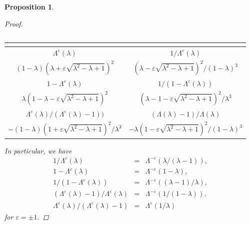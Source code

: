 \documentclass[a4paper, 11pt]{article}
\theoremstyle{plain}
\newtheorem{prop}[defn]{Proposition}
\newcommand{\?}{\textcolor{red}{??}}
\newcommand{\lm}{\lambda}
\newcommand{\Lm}{\Lambda}
\begin{document}
\begin{prop}
\begin{proof}
\begin{center}
\begin{tabular}{c||c}
    \end{tabular}
 \end{center}

  \begin{center}
   \begin{tabular}{c||c}
    \multicolumn{2}{c}{} \\ \hline \hline

$\Lm^{\varepsilon}(\lm)$ &$1/\Lm^{\varepsilon}(\lm)$\\ \hline
$(1-\lm)(\lm+\varepsilon\sqrt{{\lm}^2-\lm+1})^2$ &$(\lm-\varepsilon\sqrt{\lm^2-\lm+1})^2/(1-\lm)^3$\\
\hline\hline
$1-\Lm^{\varepsilon}(\lm)$ & $1/(1-\Lm^{\varepsilon}(\lm))$ \\ \hline
$\lm(1-\lm-\varepsilon\sqrt{\lm^2-\lm+1})^2$ &  $(\lm-1-\varepsilon\sqrt{\lm^2-\lm+1})^2/\lm^3$ \\
\hline \hline
$\Lm^{\varepsilon}(\lm)/(\Lm^{\varepsilon}(\lm)-1))$ & $(\Lm(\lm)-1)/\Lm(\lm)$\\ \hline
$-(1-\lm)(1+\varepsilon\sqrt{\lm^2-\lm+1})^2/\lm^3$ & $-\lm(1-\varepsilon\sqrt{\lm^2-\lm+1})^2/(1-\lm)^3$\\
\hline \hline

    \end{tabular}
 \end{center}
 In particular, we have
  \begin{eqnarray*}
       1/\Lambda^{\varepsilon}(\lm)&=&\Lm^{-\varepsilon}\left( {\lm}/{(\lm-1)} \right),\\
        1-\Lm^{\varepsilon}(\lm)&=&\Lm^{-\varepsilon}(1-\lm), \\
        {1}/({1-\Lm^{\varepsilon}(\lm)})&=&\Lm^{-\varepsilon}\left(({\lm-1})/{\lm}\right),\\
       ({\Lm^{\varepsilon}(\lm)-1})/{\Lm^{\varepsilon}(\lm)}&=&\Lm^{-\varepsilon}\left({1}/({1-\lm} )\right), \\
        {\Lm^{\varepsilon}(\lm)}/({\Lm^{\varepsilon}(\lm)-1}) &=& \Lm^{\varepsilon}\left({1}/{\lm}\right)
    \end{eqnarray*}
     for $\varepsilon=\pm1$.
    \end{proof}
\end{prop}
\end{document}
